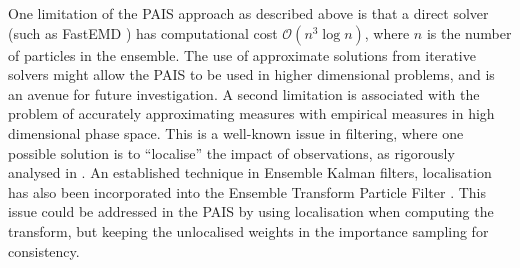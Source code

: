 \documentclass[final]{siamltex}
\begin{document}
One limitation of the PAIS approach as described above is that a
direct solver (such as FastEMD \cite{FastEMD}) has computational cost
$\mathcal{O}(n^3\log n)$, where $n$ is the number of particles in the
ensemble.  The use of approximate solutions from iterative solvers
might allow the PAIS to be used in higher dimensional problems, and is
an avenue for future investigation. A second limitation is associated
with the problem of accurately approximating measures with empirical
measures in high dimensional phase space. This is a well-known issue
in filtering, where one possible solution is to ``localise'' the
impact of observations, as rigorously analysed in
\cite{rebeschini2013can}. An established technique in Ensemble Kalman
filters, localisation has also been incorporated into the Ensemble
Transform Particle Filter \cite{ChRe2015}. This issue could be
addressed in the PAIS by using localisation when computing the
transform, but keeping the unlocalised weights in the importance
sampling for consistency.





\end{document}
